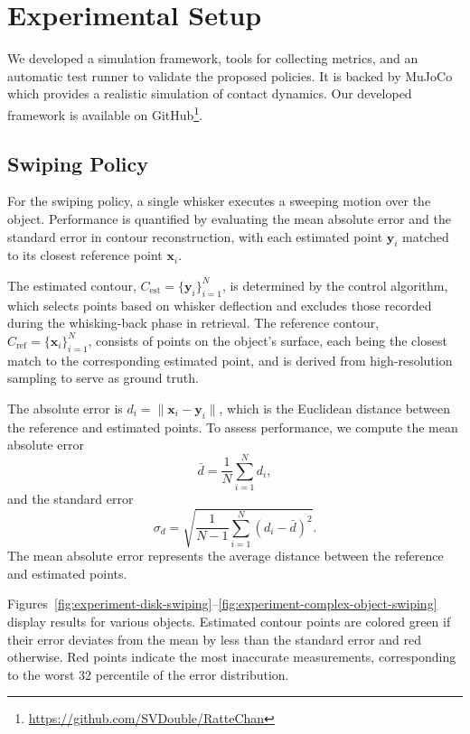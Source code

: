 

\chapter{Experimental Setup}

We developed a simulation framework, tools for collecting metrics, and an automatic test runner to validate the proposed policies.
It is backed by MuJoCo which provides a realistic simulation of contact dynamics.
Our developed framework is available on GitHub\footnote{\url{https://github.com/SVDouble/RatteChan}}.


\section{Swiping Policy} \label{sec:swiping-policy}

For the swiping policy, a single whisker executes a sweeping motion over the object.
Performance is quantified by evaluating the mean absolute error and the standard error in contour reconstruction, with each estimated point $\mathbf{y}_i$ matched to its closest reference point $\mathbf{x}_i$.

The estimated contour, $C_{\text{est}} = \{\mathbf{y}_i\}_{i=1}^N$, is determined by the control algorithm, which selects points based on whisker deflection and excludes those recorded during the whisking-back phase in retrieval.
The reference contour, $C_{\text{ref}} = \{\mathbf{x}_i\}_{i=1}^N$, consists of points on the object's surface, each being the closest match to the corresponding estimated point, and is derived from high-resolution sampling to serve as ground truth.

The absolute error is $d_i = \|\mathbf{x}_i - \mathbf{y}_i\|$, which is the Euclidean distance between the reference and estimated points.
To assess performance, we compute the mean absolute error
\[
    \bar{d} = \frac{1}{N}\sum_{i=1}^{N} d_i,
\]
and the standard error
\[
    \sigma_d = \sqrt{\frac{1}{N-1}\sum_{i=1}^{N} (d_i - \bar{d})^2}.
\]
The mean absolute error represents the average distance between the reference and estimated points.

Figures~\ref{fig:experiment-disk-swiping}--\ref{fig:experiment-complex-object-swiping} display results for various objects.
Estimated contour points are colored green if their error deviates from the mean by less than the standard error and red otherwise.
Red points indicate the most inaccurate measurements, corresponding to the worst 32 percentile of the error distribution.

